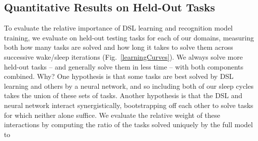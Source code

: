 \documentclass{article}
\newcommand{\systemEnding}{\textsc{DreamCoder}}
\begin{document}
\subsection{Quantitative Results on Held-Out Tasks}\label{quantitative}
To evaluate the relative importance of DSL learning and recognition
model training, we evaluate on held-out testing tasks for each of our
domains, measuring both how many tasks are solved and how long it
takes to solve them across successive wake/sleep iterations
(Fig.~\ref{learningCurves}).  We always solve more held-out tasks --
and generally solve them in less time -- with both components
combined.  Why?  One hypothesis is that some tasks are best solved by
DSL learning and others by a neural network, and so including both of
our sleep cycles  takes the union of these sets of tasks.  Another
hypothesis is that the DSL and neural network interact
synergistically, bootstrapping off each other to solve tasks for which
neither alone suffice. We evaluate the relative weight of these interactions by
computing the ratio of the tasks solved uniquely by the full model to 





\end{document}
